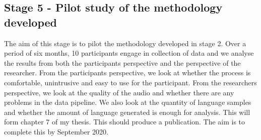 \documentclass[11pt]{article}
\begin{document}
\subsection*{Stage 5 - Pilot study of the methodology developed}
The aim of this stage is to pilot the methodology developed in stage 2. Over a period of six months, 10 participants engage in collection of data and we analyse the results from both the participants perspective and the perspective of the researcher. From the participants perspective, we look at whether the process is comfortable, unintrusive and easy to use for the participant. From the researchers perspective, we look at the quality of the audio and whether there are any problems in the data pipeline. We also look at the quantity of language samples and whether the amount of language generated is enough for analysis. This will form chapter 7 of my thesis. This should produce a publication. The aim is to complete this by September 2020.
\end{document}
